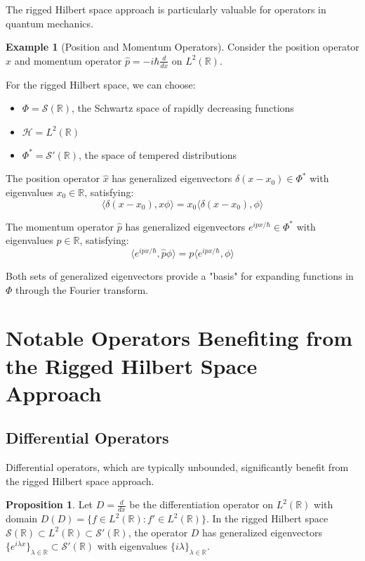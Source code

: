 \documentclass[12pt,a4paper]{article}
\theoremstyle{definition}
\newtheorem{proposition}[theorem]{Proposition}
\newtheorem{example}{Example}
\begin{document}
The rigged Hilbert space approach is particularly valuable for operators in quantum mechanics.

\begin{example}[Position and Momentum Operators]
Consider the position operator $\hat{x}$ and momentum operator $\hat{p} = -i\hbar \frac{d}{dx}$ on $L^2(\mathbb{R})$.

For the rigged Hilbert space, we can choose:
\begin{itemize}
    \item $\Phi = \mathcal{S}(\mathbb{R})$, the Schwartz space of rapidly decreasing functions
    \item $\mathcal{H} = L^2(\mathbb{R})$
    \item $\Phi^* = \mathcal{S}'(\mathbb{R})$, the space of tempered distributions
\end{itemize}

The position operator $\hat{x}$ has generalized eigenvectors $\delta(x-x_0) \in \Phi^*$ with eigenvalues $x_0 \in \mathbb{R}$, satisfying:
\begin{equation}
    \langle \delta(x-x_0), \hat{x}\phi \rangle = x_0 \langle \delta(x-x_0), \phi \rangle
\end{equation}

The momentum operator $\hat{p}$ has generalized eigenvectors $e^{ipx/\hbar} \in \Phi^*$ with eigenvalues $p \in \mathbb{R}$, satisfying:
\begin{equation}
    \langle e^{ipx/\hbar}, \hat{p}\phi \rangle = p \langle e^{ipx/\hbar}, \phi \rangle
\end{equation}

Both sets of generalized eigenvectors provide a "basis" for expanding functions in $\Phi$ through the Fourier transform.
\end{example}

\section{Notable Operators Benefiting from the Rigged Hilbert Space Approach}

\subsection{Differential Operators}

Differential operators, which are typically unbounded, significantly benefit from the rigged Hilbert space approach.

\begin{proposition}
Let $D = \frac{d}{dx}$ be the differentiation operator on $L^2(\mathbb{R})$ with domain $D(D) = \{f \in L^2(\mathbb{R}) : f' \in L^2(\mathbb{R})\}$. In the rigged Hilbert space $\mathcal{S}(\mathbb{R}) \subset L^2(\mathbb{R}) \subset \mathcal{S}'(\mathbb{R})$, the operator $D$ has generalized eigenvectors $\{e^{i\lambda x}\}_{\lambda \in \mathbb{R}} \subset \mathcal{S}'(\mathbb{R})$ with eigenvalues $\{i\lambda\}_{\lambda \in \mathbb{R}}$.
\end{proposition}
\end{document}
